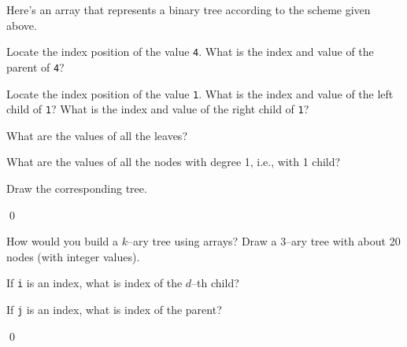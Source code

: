 \newpage
\begin{ex}
Here's an array that represents a binary tree according to the
scheme given above.



\begin{tightlist}
  \item Locate the index position of the value \texttt{4}.
  What is the index and value of the parent of \texttt{4}?
  \item Locate the index position of the value \texttt{1}.
  What is the index and value of the left child of \texttt{1}?
  What is the index and value of the right child of \texttt{1}?
  \item What are the values of all the leaves?
  \item What are the values of all the nodes with degree 1, i.e., with 1
  child?
  \item Draw the corresponding tree.
\end{tightlist}
\qed
\end{ex}


\newpage
\begin{ex}
How would you build a $k$--ary tree using 
arrays?
Draw a $3$--ary tree with about 20 nodes (with integer values).
\begin{tightlist}
  \item If \texttt{i} is an index, what is index of the $d$--th child?
  \item If \texttt{j} is an index, what is index of the parent?
\end{tightlist}
\qed
\end{ex}
 
